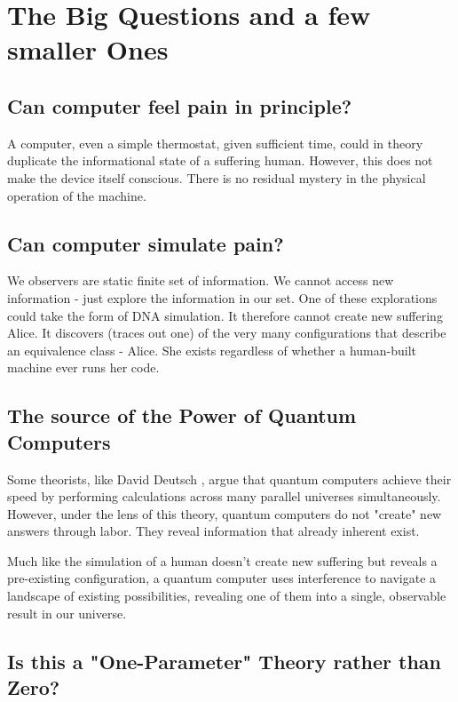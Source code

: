 \chapter{The Big Questions and a few smaller Ones}

\section*{Can computer feel pain in principle?}

A computer, even a simple thermostat, given sufficient time, could in theory duplicate the informational state of a suffering human.
However, this does not make the device itself conscious. There is no residual mystery in the physical operation of the machine.

\section{Can computer simulate pain?}

We  observers are static finite set of information. We cannot access new information - just explore the information in our set. 
One of these explorations could take the form of DNA simulation. It therefore cannot create new suffering Alice.
It discovers (traces out one) of the very many configurations that describe an equivalence class - Alice.
She exists regardless of whether a human-built machine ever runs her code.


\section*{The source of the Power of Quantum Computers}

Some theorists, like David Deutsch \cite{deutsch1997fabric}, argue that quantum computers achieve their speed by performing calculations across many parallel universes simultaneously.
However, under the lens of this theory, quantum computers do not "create" new answers through labor.
They reveal information that already inherent exist. 

Much like the simulation of a human doesn't create new suffering but reveals a pre-existing configuration, a quantum computer uses interference to navigate a landscape of existing possibilities, revealing one of them into a single, observable result in our universe.


\section*{Is this a "One-Parameter" Theory rather than Zero?}

